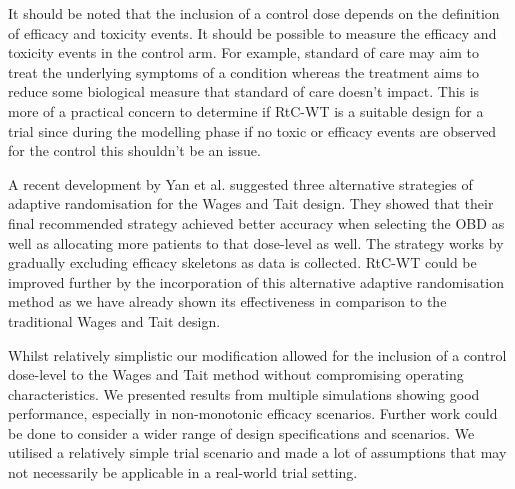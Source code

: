 It should be noted that the inclusion of a control dose depends on the definition of efficacy and toxicity events. It should be possible to measure the efficacy and toxicity events in the control arm. For example, standard of care may aim to treat the underlying symptoms of a condition whereas the treatment aims to reduce some biological measure that standard of care doesn't impact. This is more of a practical concern to determine if RtC-WT is a suitable design for a trial since during the modelling phase if no toxic or efficacy events are observed for the control this shouldn't be an issue. 

A recent development by Yan et al. \cite{yanImprovedAdaptiveRandomization2019} suggested three alternative strategies of adaptive randomisation for the Wages and Tait design. They showed that their final recommended strategy achieved better accuracy when selecting the OBD as well as allocating more patients to that dose-level as well. The strategy works by gradually excluding efficacy skeletons as data is collected. RtC-WT could be improved further by the incorporation of this alternative adaptive randomisation method as we have already shown its effectiveness in comparison to the traditional Wages and Tait design.  

Whilst relatively simplistic our modification allowed for the inclusion of a control dose-level to the Wages and Tait method without compromising operating characteristics. We presented results from multiple simulations showing good performance, especially in non-monotonic efficacy scenarios. Further work could be done to consider a wider range of design specifications and scenarios. We utilised a relatively simple trial scenario and made a lot of assumptions that may not necessarily  be applicable in a real-world trial setting.  
